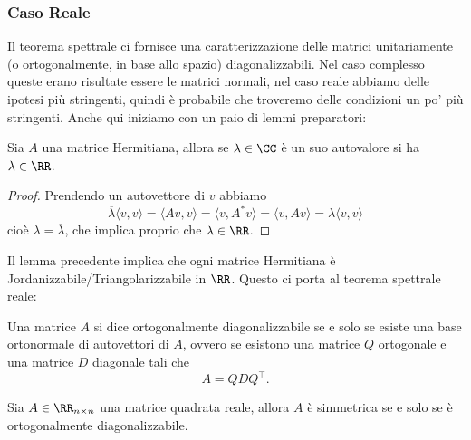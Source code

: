 \documentclass[11pt]{scrartcl}
\begin{document}
   	 \subsubsection{Caso Reale}
   	 Il teorema spettrale ci fornisce una caratterizzazione delle matrici unitariamente (o ortogonalmente, in base allo spazio) diagonalizzabili. Nel caso complesso queste erano risultate essere le matrici normali, nel caso reale abbiamo delle ipotesi più stringenti, quindi è probabile che troveremo delle condizioni un po' più stringenti. Anche qui iniziamo con un paio di lemmi preparatori:
   	 \begin{lemma}
   	 	Sia $A$ una matrice Hermitiana, allora se $\lambda\in\CC$ è un suo autovalore si ha $\lambda\in\RR$.
   	 \end{lemma}
   	 \begin{proof}
   	 	Prendendo un autovettore di $v$ abbiamo
   	 	$$\overline{\lambda}\langle v,v\rangle=\langle Av,v\rangle = \langle v,A^*v \rangle=\langle v,Av\rangle=\lambda \langle v,v\rangle$$
   	 	cioè $\lambda=\overline{\lambda}$, che implica proprio che $\lambda\in\RR$.
   	 \end{proof}
   	 Il lemma precedente implica che ogni matrice Hermitiana è Jordanizzabile/Triangolarizzabile in $\RR$. Questo ci porta al teorema spettrale reale:
   	 \begin{definition}
   	 	Una matrice $A$ si dice ortogonalmente diagonalizzabile se e solo se esiste una base ortonormale di autovettori di $A$, ovvero se esistono una matrice $Q$ ortogonale e una matrice $D$ diagonale tali che
   	 	$$A=QDQ^\intercal.$$
   	 \end{definition}
   	 \begin{theorem}
   	 	Sia $A\in\RR_{n\times n}$ una matrice quadrata reale, allora $A$ è simmetrica se e solo se è ortogonalmente diagonalizzabile.
   	 \end{theorem}
\end{document}
